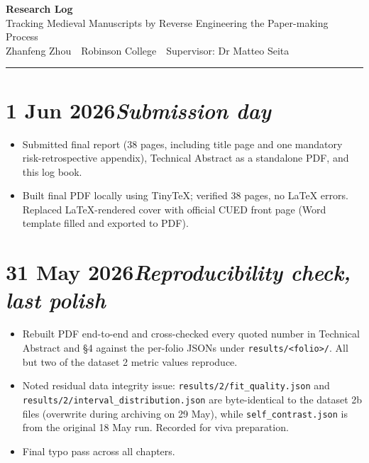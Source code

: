 \documentclass[11pt,a4paper]{article}
\newcommand{\logentry}[2]{\section*{#1\hfill\normalfont\normalsize\textit{#2}}}
\begin{document}
\begin{center}
  \Large\textbf{Research Log}\\[2pt]
  \normalsize Tracking Medieval Manuscripts by Reverse Engineering the Paper-making Process\\
  \normalsize Zhanfeng Zhou \,\textbar\, Robinson College \,\textbar\, Supervisor: Dr Matteo Seita
\end{center}

\vspace{4pt}\hrule\vspace{8pt}


\logentry{1 Jun 2026}{Submission day}
\begin{itemize}
  \item Submitted final report (38 pages, including title page and one mandatory risk-retrospective appendix), Technical Abstract as a standalone PDF, and this log book.
  \item Built final PDF locally using TinyTeX; verified 38 pages, no LaTeX errors. Replaced LaTeX-rendered cover with official CUED front page (Word template filled and exported to PDF).
\end{itemize}

\logentry{31 May 2026}{Reproducibility check, last polish}
\begin{itemize}
  \item Rebuilt PDF end-to-end and cross-checked every quoted number in Technical Abstract and \S 4 against the per-folio JSONs under \texttt{results/<folio>/}. All but two of the dataset 2 metric values reproduce.
  \item Noted residual data integrity issue: \texttt{results/2/fit\_quality.json} and \texttt{results/2/interval\_distribution.json} are byte-identical to the dataset 2b files (overwrite during archiving on 29 May), while \texttt{self\_contrast.json} is from the original 18 May run. Recorded for viva preparation.
  \item Final typo pass across all chapters.
\end{itemize}
\end{document}
